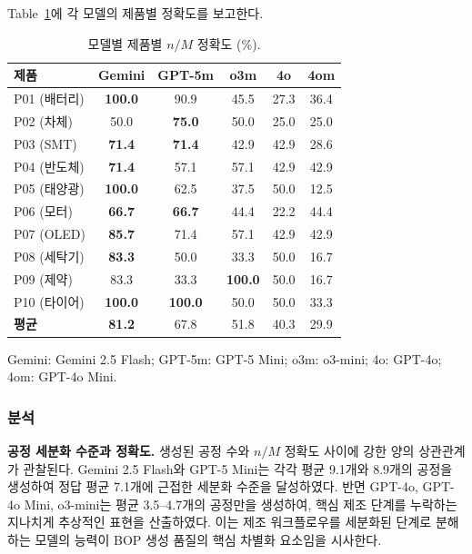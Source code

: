 Table~\ref{tab:product_results}에 각 모델의 제품별 정확도를 보고한다.

\begin{table}[htbp]
\centering
\caption{모델별 제품별 $n/M$ 정확도 (\%).}
\label{tab:product_results}
\begin{tabular}{lccccc}
\hline
\textbf{제품} & \textbf{Gemini} & \textbf{GPT-5m} & \textbf{o3m} & \textbf{4o} & \textbf{4om} \\
\hline
P01 (배터리)    & \textbf{100.0} & 90.9 & 45.5 & 27.3 & 36.4 \\
P02 (차체)      & 50.0  & \textbf{75.0} & 50.0 & 25.0 & 25.0 \\
P03 (SMT)       & \textbf{71.4} & \textbf{71.4} & 42.9 & 42.9 & 28.6 \\
P04 (반도체)    & \textbf{71.4} & 57.1 & 57.1 & 42.9 & 42.9 \\
P05 (태양광)    & \textbf{100.0} & 62.5 & 37.5 & 50.0 & 12.5 \\
P06 (모터)      & \textbf{66.7} & \textbf{66.7} & 44.4 & 22.2 & 44.4 \\
P07 (OLED)      & \textbf{85.7} & 71.4 & 57.1 & 42.9 & 42.9 \\
P08 (세탁기)    & \textbf{83.3} & 50.0 & 33.3 & 50.0 & 16.7 \\
P09 (제약)      & 83.3 & 33.3 & \textbf{100.0} & 50.0 & 16.7 \\
P10 (타이어)    & \textbf{100.0} & \textbf{100.0} & 50.0 & 50.0 & 33.3 \\
\hline
\textbf{평균}   & \textbf{81.2} & 67.8 & 51.8 & 40.3 & 29.9 \\
\hline
\end{tabular}
\begin{tablenotes}
\small
\item Gemini: Gemini 2.5 Flash; GPT-5m: GPT-5 Mini; o3m: o3-mini; 4o: GPT-4o; 4om: GPT-4o Mini.
\end{tablenotes}
\end{table}

\subsubsection{분석}

\textbf{공정 세분화 수준과 정확도.}
생성된 공정 수와 $n/M$ 정확도 사이에 강한 양의 상관관계가 관찰된다. Gemini 2.5 Flash와 GPT-5 Mini는 각각 평균 9.1개와 8.9개의 공정을 생성하여 정답 평균 7.1개에 근접한 세분화 수준을 달성하였다. 반면 GPT-4o, GPT-4o Mini, o3-mini는 평균 3.5--4.7개의 공정만을 생성하여, 핵심 제조 단계를 누락하는 지나치게 추상적인 표현을 산출하였다. 이는 제조 워크플로우를 세분화된 단계로 분해하는 모델의 능력이 BOP 생성 품질의 핵심 차별화 요소임을 시사한다.

